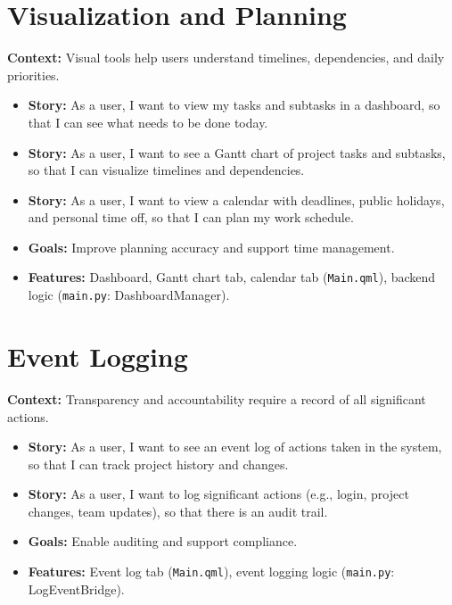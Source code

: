 \documentclass{report}
\begin{document}
\section{Visualization and Planning}
\textbf{Context:} Visual tools help users understand timelines, dependencies, and daily priorities.
\begin{itemize}
    \item \textbf{Story:} As a user, I want to view my tasks and subtasks in a dashboard, so that I can see what needs to be done today.
    \item \textbf{Story:} As a user, I want to see a Gantt chart of project tasks and subtasks, so that I can visualize timelines and dependencies.
    \item \textbf{Story:} As a user, I want to view a calendar with deadlines, public holidays, and personal time off, so that I can plan my work schedule.
    \item \textbf{Goals:} Improve planning accuracy and support time management.
    \item \textbf{Features:} Dashboard, Gantt chart tab, calendar tab (\texttt{Main.qml}), backend logic (\texttt{main.py}: DashboardManager).
\end{itemize}

\section{Event Logging}
\textbf{Context:} Transparency and accountability require a record of all significant actions.
\begin{itemize}
    \item \textbf{Story:} As a user, I want to see an event log of actions taken in the system, so that I can track project history and changes.
    \item \textbf{Story:} As a user, I want to log significant actions (e.g., login, project changes, team updates), so that there is an audit trail.
    \item \textbf{Goals:} Enable auditing and support compliance.
    \item \textbf{Features:} Event log tab (\texttt{Main.qml}), event logging logic (\texttt{main.py}: LogEventBridge).
\end{itemize}
\end{document}
